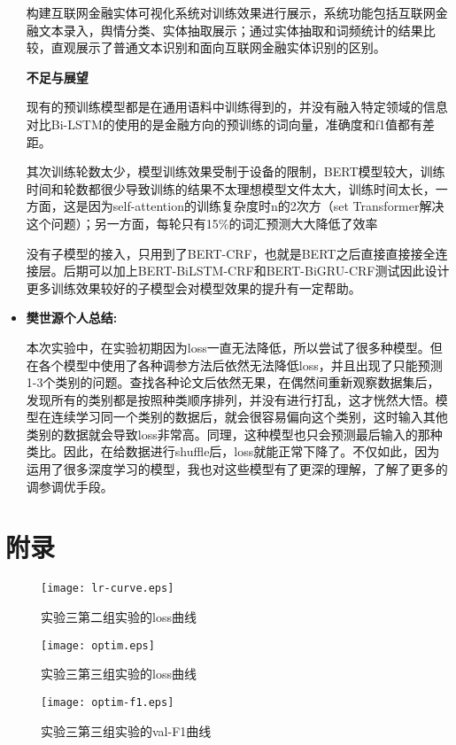 \documentclass[letterpaper]{article}
\begin{document}
\begin{itemize}
  构建互联网金融实体可视化系统对训练效果进行展示，系统功能包括互联网金融文本录入，舆情分类、实体抽取展示；通过实体抽取和词频统计的结果比较，直观展示了普通文本识别和面向互联网金融实体识别的区别。

  \textbf{不足与展望}
  
  现有的预训练模型都是在通用语料中训练得到的，并没有融入特定领域的信息对比Bi-LSTM的使用的是金融方向的预训练的词向量，准确度和f1值都有差距。
  
  其次训练轮数太少，模型训练效果受制于设备的限制，BERT模型较大，训练时间和轮数都很少导致训练的结果不太理想模型文件太大，训练时间太长，一方面，这是因为self-attention的训练复杂度时n的2次方（set Transformer解决这个问题）；另一方面，每轮只有15\%的词汇预测大大降低了效率
  
  没有子模型的接入，只用到了BERT-CRF，也就是BERT之后直接直接接全连接层。后期可以加上BERT-BiLSTM-CRF和BERT-BiGRU-CRF测试因此设计更多训练效果较好的子模型会对模型效果的提升有一定帮助。

  \item \textbf{樊世源个人总结:}
  
  本次实验中，在实验初期因为loss一直无法降低，所以尝试了很多种模型。但在各个模型中使用了各种调参方法后依然无法降低loss，并且出现了只能预测1-3个类别的问题。查找各种论文后依然无果，在偶然间重新观察数据集后，发现所有的类别都是按照种类顺序排列，并没有进行打乱，这才恍然大悟。模型在连续学习同一个类别的数据后，就会很容易偏向这个类别，这时输入其他类别的数据就会导致loss非常高。同理，这种模型也只会预测最后输入的那种类比。因此，在给数据进行shuffle后，loss就能正常下降了。不仅如此，因为运用了很多深度学习的模型，我也对这些模型有了更深的理解，了解了更多的调参调优手段。
\end{itemize}

\newpage
\section{附录}
\begin{figure}[htbp]
  \centering
  \texttt{[image: lr-curve.eps]}
  \caption{实验三第二组实验的loss曲线}
\end{figure}

\begin{figure}[htbp]
  \centering
  \texttt{[image: optim.eps]}
  \caption{实验三第三组实验的loss曲线}
\end{figure}

\begin{figure}[htbp]
  \centering
  \texttt{[image: optim-f1.eps]}
  \caption{实验三第三组实验的val-F1曲线}
\end{figure}
\end{document}
